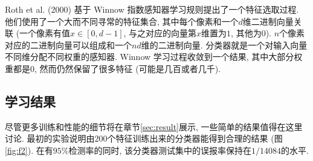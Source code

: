 \documentclass[a4paper,utf8,11pt, onecolumn]{ctexart}
\begin{document}
Roth et al. (2000) 基于 Winnow 指数感知器学习规则提出了一个特征选取过程. 他们使用了一个大而不同寻常的特征集合, 其中每个像素和一个$d$维二进制向量关联 (一个像素有值$x\in[0, d-1]$, 与之对应的向量第$x$维置为$1$, 其他为$0$). $n$个像素对应的二进制向量可以组成和一个$nd$维的二进制向量. 分类器就是一个对输入向量不同维分配不同权重的感知器. Winnow 学习过程收敛到一个结果, 其中大部分权重都是$0$, 然而仍然保留了很多特征 (可能是几百或者几千).

\subsection{学习结果}
尽管更多训练和性能的细节将在章节\ref{sec:result}展示, 一些简单的结果值得在这里讨论. 最初的实验说明由$200$个特征训练出来的分类器能得到合理的结果 (图\ref{fig:f2}). 在有$95\%$检测率的同时, 该分类器测试集中的误报率保持在$1/14084$的水平.
\end{document}
